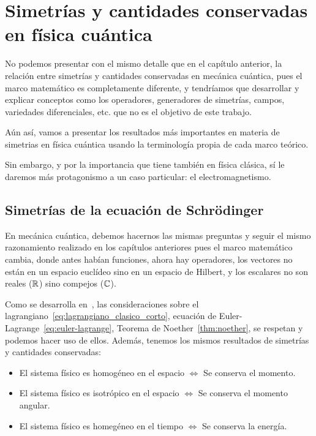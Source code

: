 
\chapter{Simetrías y cantidades conservadas en física cuántica}\label{ch:simetrias-y-cantidades-conservadas-en-fisica-cuantica}

No podemos presentar con el mismo detalle que en el capítulo anterior, la relación entre simetrías y cantidades conservadas en mecánica cuántica, pues el marco matemático es completamente diferente, y tendríamos que desarrollar y explicar conceptos como los operadores, generadores de simetrías, campos, variedades diferenciales, etc. que no es el objetivo de este trabajo.

Aún así, vamos a presentar los resultados más importantes en materia de simetrias en física cuántica usando la terminología propia de cada marco teórico.

Sin embargo, y por la importancia que tiene también en física clásica, sí le daremos más protagonismo a un caso particular: el electromagnetismo.

\section{Simetrías de la ecuación de Schrödinger}

En mecánica cuántica, debemos hacernos las mismas preguntas y seguir el mismo razonamiento realizado en los capítulos anteriores pues el marco matemático cambia, donde antes habían funciones, ahora hay operadores, los vectores no están en un espacio euclídeo sino en un espacio de Hilbert, y los escalares no son reales ($\mathbb{R}$) sino compejos ($\mathbb{C}$).

Como se desarrolla en~\autocite{QMS}, las consideraciones sobre el lagrangiano~\eqref{eq:lagrangiano_clasico_corto}, ecuación de Euler-Lagrange~\eqref{eq:euler-lagrange}, Teorema de Noether~\eqref{thm:noether}, se respetan y podemos hacer uso de ellos.
Además, tenemos los mismos resultados de simetrías y cantidades conservadas:

\begin{itemize}
	\item El sistema físico es homogéneo en el espacio $\Leftrightarrow$ Se conserva el momento.
	\item El sistema físico es isotrópico en el espacio $\Leftrightarrow$ Se conserva el momento angular.
	\item El sistema físico es homegéneo en el tiempo $\Leftrightarrow$ Se conserva la energía.
\end{itemize}

